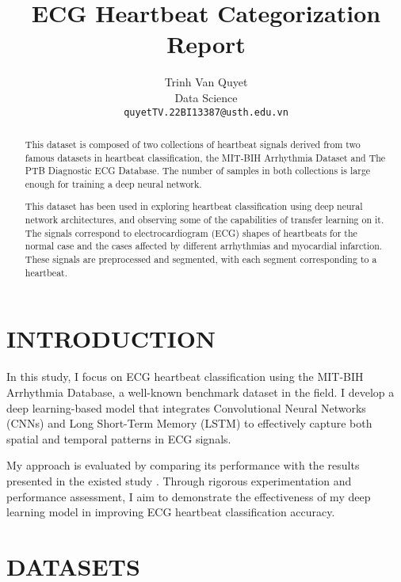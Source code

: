 \documentclass[10pt, conference]{IEEEtran}
\title{ECG Heartbeat Categorization Report}
\author{Trinh Van Quyet\\ Data Science\\ \texttt{quyetTV.22BI13387@usth.edu.vn}}
\date{}
\begin{document}
	\maketitle
	
	\begin{abstract}
		This dataset is composed of two collections of heartbeat signals derived from two famous datasets in heartbeat classification, the MIT-BIH Arrhythmia Dataset and The PTB Diagnostic ECG Database. The number of samples in both collections is large enough for training a deep neural network.
		
		This dataset has been used in exploring heartbeat classification using deep neural network architectures, and observing some of the capabilities of transfer learning on it. The signals correspond to electrocardiogram (ECG) shapes of heartbeats for the normal case and the cases affected by different arrhythmias and myocardial infarction. These signals are preprocessed and segmented, with each segment corresponding to a heartbeat.
	\end{abstract}
	
	
	\section{\textbf{I}NTRODUCTION}
	In this study, I focus on ECG heartbeat classification using the MIT-BIH Arrhythmia Database, a well-known benchmark dataset in the field. I develop a deep learning-based model that integrates Convolutional Neural Networks (CNNs) and Long Short-Term Memory (LSTM) to effectively capture both spatial and temporal patterns in ECG signals. 
	
	My approach is evaluated by comparing its performance with the results presented in the existed study \cite{kachuee2018}. Through rigorous experimentation and performance assessment, I aim to demonstrate the effectiveness of my deep learning model in improving ECG heartbeat classification accuracy. 
	
	\section{\textbf{D}ATASETS}
	
\end{document}
